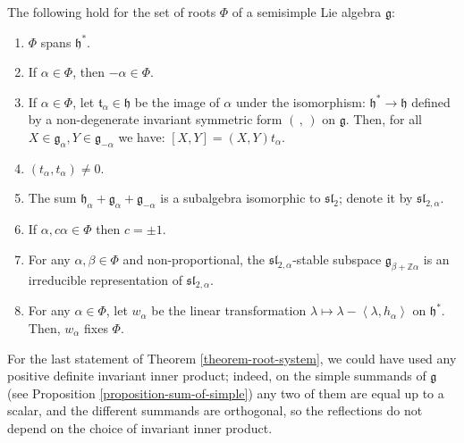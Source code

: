 \begin{theorem}
 \label{theorem-root-system}
The following hold for the set of roots $\Phi$ of a semisimple Lie algebra $\mathfrak g$: 
\begin{enumerate}
 \item $\Phi$ spans $\mathfrak h^*$.
 \item If $\alpha\in \Phi$, then $-\alpha\in \Phi$.
 \item If $\alpha\in\Phi$, let $\mathfrak t_\alpha \in \mathfrak h$ be the image of $\alpha$ under the isomorphism: $\mathfrak h^*\to\mathfrak h$ defined by a non-degenerate invariant symmetric form $(\,,\,)$ on $\mathfrak g$. Then, for all $X\in \mathfrak g_\alpha, Y\in\mathfrak g_{-\alpha}$ we have: $[X,Y] = (X,Y) t_\alpha$. 
 \item $(t_\alpha,t_\alpha)\ne 0$.
 \item The sum $\mathfrak h_\alpha+ \mathfrak g_\alpha + \mathfrak g_{-\alpha}$ is a subalgebra isomorphic to $\mathfrak{sl}_2$; denote it by $\mathfrak{sl}_{2,\alpha}$.
 \item  If $\alpha, c\alpha\in \Phi$ then $c = \pm 1$.
 \item For any $\alpha, \beta\in \Phi$ and non-proportional, the $\mathfrak{sl}_{2,\alpha}$-stable subspace $\mathfrak g_{\beta + \mathbb Z \alpha}$ is an irreducible representation of $\mathfrak{sl}_{2,\alpha}$.
 \item For any $\alpha\in \Phi$, let $w_\alpha$ be the linear transformation $\lambda\mapsto \lambda - \left< \lambda, h_\alpha\right>$ on $\mathfrak h^*$. Then, $w_\alpha$ fixes $\Phi$.
\end{enumerate}
\end{theorem}

\begin{remark}
 \label{remark-indep-of-form}
For the last statement of Theorem \ref{theorem-root-system}, we could have used any positive definite invariant inner product; indeed, on the simple summands of $\mathfrak g$ (see Proposition \ref{proposition-sum-of-simple}) any two of them are equal up to a scalar, and the different summands are orthogonal, so the reflections do not depend on the choice of invariant inner product. 
\end{remark}



